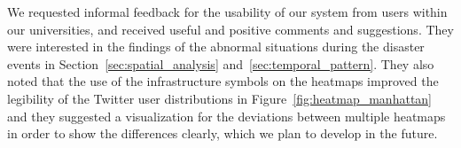 We requested informal feedback for the usability of our system from users within our universities, and received useful and positive comments and suggestions.
They were interested in the findings of the abnormal situations during the disaster events in Section~\ref{sec:spatial_analysis} and~\ref{sec:temporal_pattern}. They also noted that the use of the infrastructure symbols on the heatmaps improved the legibility of the Twitter user distributions in Figure~\ref{fig:heatmap_manhattan}
and they suggested a visualization for the deviations between multiple heatmaps in order to show the differences clearly, which we plan to develop in the future.



